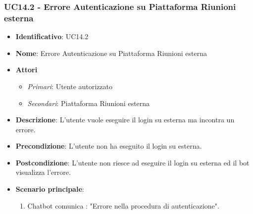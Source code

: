 \subsubsection{UC14.2 - Errore Autenticazione su Piattaforma Riunioni esterna}
\begin{itemize}
	\item \textbf{Identificativo}: UC14.2
	\item \textbf{Nome}: Errore Autenticazione su Piattaforma Riunioni esterna
	\item \textbf{Attori}
	\begin{itemize} 
		\item \textit{Primari}: Utente autorizzato
		\item \textit{Secondari}: Piattaforma Riunioni esterna
	\end{itemize}
	\item \textbf{Descrizione}: L'utente vuole eseguire il login su  esterna ma incontra un errore.
	\item \textbf{Precondizione}: L'utente non ha eseguito il login su  esterna.
	\item \textbf{Postcondizione}: L'utente non riesce ad eseguire il login su  esterna ed il bot visualizza l'errore.
	\item \textbf{Scenario principale}: \begin{enumerate}
		\item Chatbot comunica : "Errore nella procedura di autenticazione". 
	\end{enumerate}
\end{itemize}

